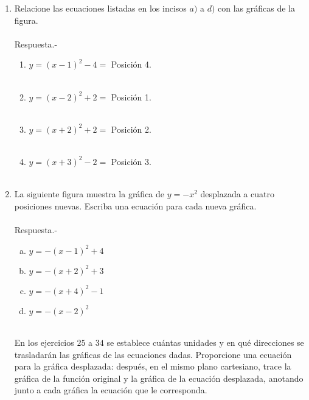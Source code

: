 \begin{enumerate}
\item Relacione las ecuaciones listadas en los incisos $a)$ a $d)$ con las gráficas de la figura.\\\\
    Respuesta.-\;
    \begin{enumerate}[\bfseries a)]

	\item $y=(x-1)^2 - 4 = $ Posición 4.\\\\

	\item $y=(x-2)^2 + 2 = $ Posición 1.\\\\

	\item $y=(x+2)^2 + 2 = $ Posición 2.\\\\

	\item $y=(x+3)^2 - 2 = $ Posición 3.\\\\
    \end{enumerate}

\item La siguiente figura muestra la gráfica de $y=-x^2$ desplazada a cuatro posiciones nuevas. Escriba una ecuación para cada nueva gráfica.\\\\
    Respuesta.-\; 
    \begin{enumerate}[a)]
	\item $y=-(x-1)^2 + 4$\\
	\item $y=-(x+2)^2 + 3$\\
	\item $y=-(x+4)^2 - 1$\\
	\item $y=-(x-2)^2$\\\\
    \end{enumerate}

En los ejercicios $25$ a $34$ se establece cuántas unidades y en qué direcciones se trasladarán las gráficas de las ecuaciones dadas. Proporcione una ecuación para la gráfica desplazada: después, en el mismo plano cartesiano, trace la gráfica de la función original y la gráfica de la ecuación desplazada, anotando junto a cada gráfica la ecuación que le corresponda.\\\\


\end{enumerate}
